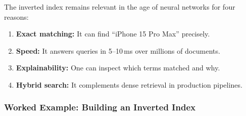 \documentclass[aspectratio=169]{beamer} \usetheme{TUDelft} %
\theoremstyle{definition}
\theoremstyle{plain}
\begin{document}
The inverted index remains relevant in the age of neural networks for four reasons:
\begin{enumerate}
    \item \textbf{Exact matching:} It can find ``iPhone 15 Pro Max'' precisely.
    \item \textbf{Speed:} It answers queries in 5--10\,ms over millions of documents.
    \item \textbf{Explainability:} One can inspect which terms matched and why.
    \item \textbf{Hybrid search:} It complements dense retrieval in production pipelines.
\end{enumerate}

\subsubsection{Worked Example: Building an Inverted Index}
\end{document}

